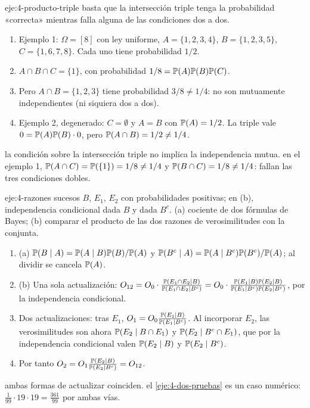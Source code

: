 \begin{solucion}{eje:4-producto-triple}
\planteamiento basta que la intersección triple tenga la probabilidad «correcta» mientras falla alguna de las condiciones dos a dos.
\pasos
\begin{enumerate}[label=\arabic*.]
  \item Ejemplo 1: $\Omega=[8]$ con ley uniforme, $A=\{1,2,3,4\}$, $B=\{1,2,3,5\}$, $C=\{1,6,7,8\}$. Cada uno tiene probabilidad $1/2$.
  \item $A\cap B\cap C=\{1\}$, con probabilidad $1/8=\mathbb{P}(A)\mathbb{P}(B)\mathbb{P}(C)$.
  \item Pero $A\cap B=\{1,2,3\}$ tiene probabilidad $3/8\neq1/4$: no son mutuamente independientes (ni siquiera dos a dos).
  \item Ejemplo 2, degenerado: $C=\emptyset$ y $A=B$ con $\mathbb{P}(A)=1/2$. La triple vale $0=\mathbb{P}(A)\mathbb{P}(B)\cdot0$, pero $\mathbb{P}(A\cap B)=1/2\neq1/4$.
\end{enumerate}
\resultado la condición sobre la intersección triple no implica la independencia mutua.
\comprobacion en el ejemplo 1, $\mathbb{P}(A\cap C)=\mathbb{P}(\{1\})=1/8\neq1/4$ y $\mathbb{P}(B\cap C)=1/8\neq1/4$: fallan las tres condiciones dobles.
\end{solucion}

\begin{solucion}{eje:4-razones}
\datos sucesos $B$, $E_1$, $E_2$ con probabilidades positivas; en (b), independencia condicional dada $B$ y dada $B^{c}$.
\planteamiento (a) cociente de dos fórmulas de Bayes; (b) comparar el producto de las dos razones de verosimilitudes con la conjunta.
\pasos
\begin{enumerate}[label=\arabic*.]
  \item (a) $\mathbb{P}(B\mid A)=\mathbb{P}(A\mid B)\mathbb{P}(B)/\mathbb{P}(A)$ y $\mathbb{P}(B^{c}\mid A)=\mathbb{P}(A\mid B^{c})\mathbb{P}(B^{c})/\mathbb{P}(A)$; al dividir se cancela $\mathbb{P}(A)$.
  \item (b) Una sola actualización: $O_{12}=O_0\cdot\frac{\mathbb{P}(E_1\cap E_2\mid B)}{\mathbb{P}(E_1\cap E_2\mid B^{c})}=O_0\cdot\frac{\mathbb{P}(E_1\mid B)\mathbb{P}(E_2\mid B)}{\mathbb{P}(E_1\mid B^{c})\mathbb{P}(E_2\mid B^{c})}$, por la independencia condicional.
  \item Dos actualizaciones: tras $E_1$, $O_1=O_0\frac{\mathbb{P}(E_1\mid B)}{\mathbb{P}(E_1\mid B^{c})}$. Al incorporar $E_2$, las verosimilitudes son ahora $\mathbb{P}(E_2\mid B\cap E_1)$ y $\mathbb{P}(E_2\mid B^{c}\cap E_1)$, que por la independencia condicional valen $\mathbb{P}(E_2\mid B)$ y $\mathbb{P}(E_2\mid B^{c})$.
  \item Por tanto $O_2=O_1\frac{\mathbb{P}(E_2\mid B)}{\mathbb{P}(E_2\mid B^{c})}=O_{12}$.
\end{enumerate}
\resultado ambas formas de actualizar coinciden.
\comprobacion el \cref{eje:4-dos-pruebas} es un caso numérico: $\frac1{99}\cdot19\cdot19=\frac{361}{99}$ por ambas vías.
\end{solucion}

